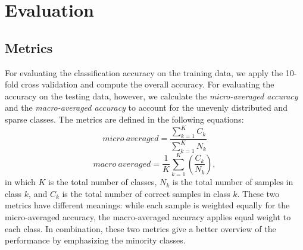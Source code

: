 \documentclass{article}
\begin{document}

\section{Evaluation}\label{sec:eval}
\subsection{Metrics}\label{ssec:metrics}
For evaluating the classification accuracy on the training data, we apply the 10-fold cross validation {\color{red}{why is the cross validation mentioned in 'Metrics'?}} and compute the overall accuracy. For evaluating the accuracy on the testing data, however, we calculate the \textit{micro-averaged accuracy} and the \textit{macro-averaged accuracy}\cite{yang1999} to account for the unevenly distributed and sparse classes. The metrics are defined in the following equations:
\begin{equation}
micro~averaged = \frac{ \sum_{k = 1}^{K} C_{k} }{ \sum_{k = 1}^{K} N_{k} }
\end{equation}
\begin{equation}
macro~averaged = \frac{1}{K} \sum_{k = 1}^{K} (\frac{C_{k}}{N_{k}}),
\end{equation}
in which $K$ is the total number of classes, $N_{k}$ is the total number of samples in class $k$, and $C_{k}$ is the total number of correct samples in class $k$. These two metrics have different meanings: while each sample is weighted equally for the micro-averaged accuracy, the macro-averaged accuracy applies equal weight to each class. In combination, these two metrics give a better overview of the performance by emphasizing the minority classes. {\color{red}{I don't understand -- this is only for the macro average, not both. Also, don't you think this whole description may be a bit lengthy?}}  

{\color{red}{Would you consider a methodology section here or as first section. Because the following paragraph has mostly not much to do with the results but describes the setup.}}
\end{document}
